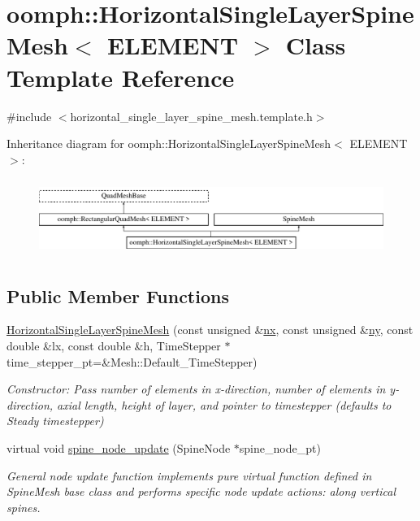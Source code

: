 \hypertarget{classoomph_1_1HorizontalSingleLayerSpineMesh}{}\section{oomph\+:\+:Horizontal\+Single\+Layer\+Spine\+Mesh$<$ E\+L\+E\+M\+E\+NT $>$ Class Template Reference}
\label{classoomph_1_1HorizontalSingleLayerSpineMesh}


{\ttfamily \#include $<$horizontal\+\_\+single\+\_\+layer\+\_\+spine\+\_\+mesh.\+template.\+h$>$}

Inheritance diagram for oomph\+:\+:Horizontal\+Single\+Layer\+Spine\+Mesh$<$ E\+L\+E\+M\+E\+NT $>$\+:\begin{figure}[H]
\begin{center}
\leavevmode
\includegraphics[height=2.522523cm]{classoomph_1_1HorizontalSingleLayerSpineMesh}
\end{center}
\end{figure}
\subsection*{Public Member Functions}
\begin{DoxyCompactItemize}
\item 
\hyperlink{classoomph_1_1HorizontalSingleLayerSpineMesh_a765856597150d37a20eabdb53e58d49c}{Horizontal\+Single\+Layer\+Spine\+Mesh} (const unsigned \&\hyperlink{classoomph_1_1RectangularQuadMesh_abfef93d6322886cdce14a437186e4821}{nx}, const unsigned \&\hyperlink{classoomph_1_1RectangularQuadMesh_a86d76a55eb7c4e8bca9b74d23c8b0412}{ny}, const double \&lx, const double \&h, Time\+Stepper $\ast$time\+\_\+stepper\+\_\+pt=\&Mesh\+::\+Default\+\_\+\+Time\+Stepper)
\begin{DoxyCompactList}\small\item\em Constructor\+: Pass number of elements in x-\/direction, number of elements in y-\/direction, axial length, height of layer, and pointer to timestepper (defaults to Steady timestepper) \end{DoxyCompactList}\item 
virtual void \hyperlink{classoomph_1_1HorizontalSingleLayerSpineMesh_a4b9b833a281aa64a809b4e47159282e6}{spine\+\_\+node\+\_\+update} (Spine\+Node $\ast$spine\+\_\+node\+\_\+pt)
\begin{DoxyCompactList}\small\item\em General node update function implements pure virtual function defined in Spine\+Mesh base class and performs specific node update actions\+: along vertical spines. \end{DoxyCompactList}\end{DoxyCompactItemize}
